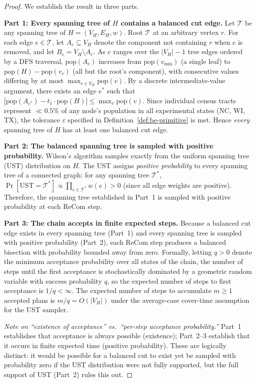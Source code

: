 \begin{proof}
  We establish the result in three parts.

  \textbf{Part 1: Every spanning tree of $H$ contains a balanced cut edge.}
  Let $\mathcal{T}$ be any spanning tree of $H = (V_H, E_H, w)$.
  Root $\mathcal{T}$ at an arbitrary vertex $r$.
  For each edge $e \in \mathcal{T}$, let $A_e \subseteq V_H$ denote the
  component not containing $r$ when $e$ is removed, and let $B_e = V_H
  \setminus A_e$.  As $e$ ranges over the $|V_H| - 1$ tree edges ordered by
  a DFS traversal, $\text{pop}(A_e)$ increases from $\text{pop}(v_{\min})$
  (a single leaf) to $\text{pop}(H) - \text{pop}(v_r)$ (all but the
  root's component), with consecutive values differing by at most
  $\max_{v \in V_H} \text{pop}(v)$.
  By a discrete intermediate-value argument, there exists an edge $e^*$ such
  that $|\text{pop}(A_{e^*}) - t_1 \cdot \text{pop}(H)| \leq \max_{v}
  \text{pop}(v)$.
  Since individual census tracts represent $\ll 0.5\%$ of any node's
  population in all experimental states (NC, WI, TX), the tolerance
  $\varepsilon$ specified in Definition~\ref{def:be-primitive} is met.
  Hence \emph{every} spanning tree of $H$ has at least one balanced cut edge.

  \textbf{Part 2: The balanced spanning tree is sampled with positive probability.}
  Wilson's algorithm \citep{wilson1996generating} samples exactly from the
  uniform spanning tree (UST) distribution on $H$.  The UST assigns
  \emph{positive probability} to every spanning tree of a connected graph:
  for any spanning tree $\mathcal{T}^*$, $\Pr[\text{UST} = \mathcal{T}^*]
  \propto \prod_{e \in \mathcal{T}^*} w(e) > 0$ (since all edge weights are
  positive).  Therefore, the spanning tree established in Part~1 is sampled
  with positive probability at each ReCom step.

  \textbf{Part 3: The chain accepts in finite expected steps.}
  Because a balanced cut edge exists in every spanning tree (Part~1) and every
  spanning tree is sampled with positive probability (Part~2), each ReCom step
  produces a balanced bisection with probability bounded away from zero.
  Formally, letting $q > 0$ denote the minimum acceptance probability over all
  states of the chain, the number of steps until the first acceptance is
  stochastically dominated by a geometric random variable with success
  probability $q$, so the expected number of steps to first acceptance is
  $1/q < \infty$.  The expected number of steps to accumulate $m \geq 1$
  accepted plans is $m/q = O(|V_H|)$ under the average-case cover-time
  assumption for the UST sampler.

  \emph{Note on ``existence of acceptance'' vs.\ ``per-step acceptance
  probability.''} Part~1 establishes that acceptance is always possible
  (existence); Part~2--3 establish that it occurs in finite expected time
  (positive probability). These are logically distinct: it would be possible
  for a balanced cut to exist yet be sampled with probability zero if the
  UST distribution were not fully supported, but the full support of UST
  (Part~2) rules this out.
\end{proof}

